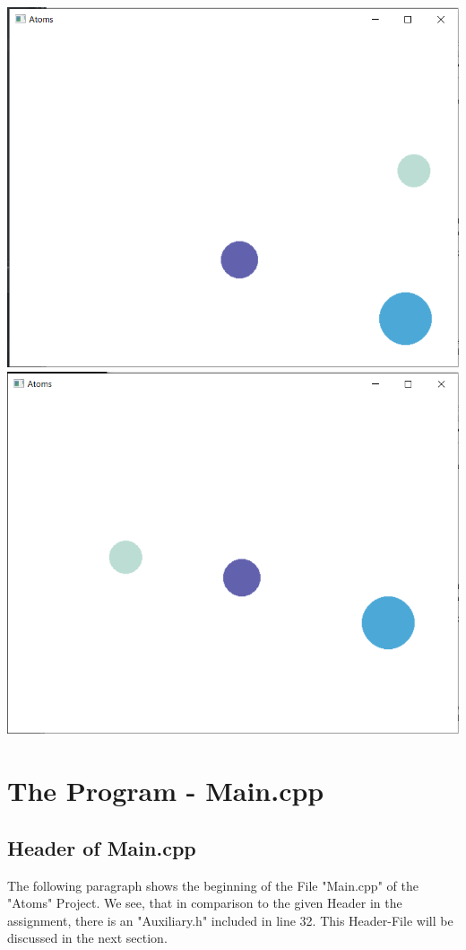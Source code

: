 \documentclass[11pt,titlepage]{article}
\begin{document}
			\includegraphics[scale=0.5]{pictures/random_collision.png}
			\includegraphics[scale=0.5]{pictures/random_collision_final.png}
			
\newpage			
	\section{The Program - Main.cpp}	
		\subsection{Header of Main.cpp}
			The following paragraph shows the beginning of the File "Main.cpp" of the "Atoms" Project. 
			We see, that in comparison to the given Header in the assignment, there is an "Auxiliary.h" included in line 32. This Header-File will be discussed in the next section.
			
\end{document}
